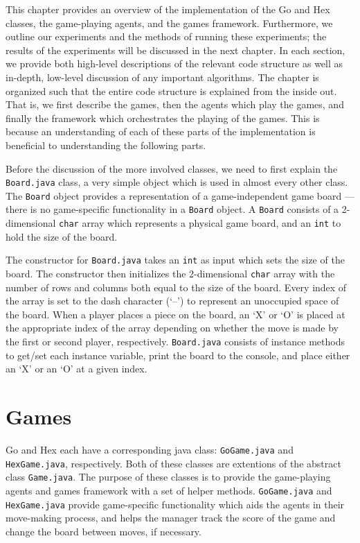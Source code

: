 This chapter provides an overview of the implementation of the Go and Hex classes, the game-playing agents, and the games framework.  Furthermore, we outline our experiments and the methods of running these experiments; the results of the experiments will be discussed in the next chapter.  In each section, we provide both high-level descriptions of the relevant code structure as well as in-depth, low-level discussion of any important algorithms.  The chapter is organized such that the entire code structure is explained from the inside out.  That is, we first describe the games, then the agents which play the games, and finally the framework which orchestrates the playing of the games.  This is because an understanding of each of these parts of the implementation is beneficial to understanding the following parts.

Before the discussion of the more involved classes, we need to first explain the \texttt{Board.java} class, a very simple object which is used in almost every other class.  The \texttt{Board} object provides a representation of a game-independent game board --- there is no game-specific functionality in a \texttt{Board} object.  A \texttt{Board} consists of a 2-dimensional \texttt{char} array which represents a physical game board, and an \texttt{int} to hold the size of the board.  

The constructor for \texttt{Board.java} takes an \texttt{int} as input which sets the size of the board.  The constructor then initializes the 2-dimensional \texttt{char} array with the number of rows and columns both equal to the size of the board.  Every index of the array is set to the dash character (`--') to represent an unoccupied space of the board.  When a player places a piece on the board, an `X' or `O' is placed at the appropriate index of the array depending on whether the move is made by the first or second player, respectively.  \texttt{Board.java} consists of instance methods to get/set each instance variable, print the board to the console, and place either an `X' or an `O' at a given index.

\section{Games}
Go and Hex each have a corresponding java class: \texttt{GoGame.java} and \texttt{HexGame.java}, respectively.  Both of these classes are extentions of the abstract class \texttt{Game.java}.  The purpose of these classes is to provide the game-playing agents and games framework with a set of helper methods. \texttt{GoGame.java} and \texttt{HexGame.java} provide game-specific functionality which aids the agents in their move-making process, and helps the manager track the score of the game and change the board between moves, if necessary.

